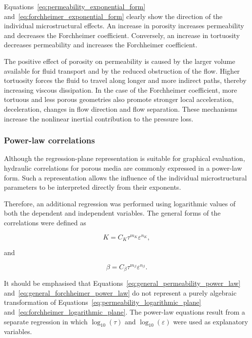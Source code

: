 \documentclass[a4paper]{article}
\begin{document}
Equations~\eqref{eq:permeability_exponential_form}
and~\eqref{eq:forchheimer_exponential_form} clearly show the direction of the
individual microstructural effects. An increase in porosity increases
permeability and decreases the Forchheimer coefficient. Conversely, an
increase in tortuosity decreases permeability and increases the Forchheimer
coefficient.

The positive effect of porosity on permeability is caused by the larger volume
available for fluid transport and by the reduced obstruction of the flow.
Higher tortuosity forces the fluid to travel along longer and more indirect
paths, thereby increasing viscous dissipation. In the case of the Forchheimer
coefficient, more tortuous and less porous geometries also promote stronger
local acceleration, deceleration, changes in flow direction and flow
separation. These mechanisms increase the nonlinear inertial contribution to
the pressure loss.

\subsubsection{Power-law correlations}
\label{sec:parametric_power_law_correlations}

Although the regression-plane representation is suitable for graphical
evaluation, hydraulic correlations for porous media are commonly expressed in
a power-law form. Such a representation allows the influence of the individual
microstructural parameters to be interpreted directly from their exponents.

Therefore, an additional regression was performed using logarithmic values of
both the dependent and independent variables. The general forms of the
correlations were defined as

\begin{equation}
K
=
C_{K}
\tau^{m_{K}}
\varepsilon^{n_{K}},
\label{eq:general_permeability_power_law}
\end{equation}

and

\begin{equation}
\beta
=
C_{\beta}
\tau^{m_{\beta}}
\varepsilon^{n_{\beta}}.
\label{eq:general_forchheimer_power_law}
\end{equation}

It should be emphasised that
Equations~\eqref{eq:general_permeability_power_law}
and~\eqref{eq:general_forchheimer_power_law} do not represent a purely
algebraic transformation of
Equations~\eqref{eq:permeability_logarithmic_plane}
and~\eqref{eq:forchheimer_logarithmic_plane}. The power-law equations result
from a separate regression in which $\log_{10}(\tau)$ and
$\log_{10}(\varepsilon)$ were used as explanatory variables.
\end{document}
